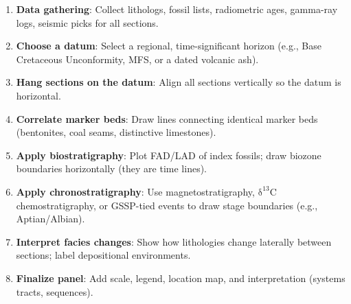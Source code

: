 \documentclass[11pt]{article}
\begin{document}
\begin{methode}
\begin{enumerate}
\item \textbf{Data gathering}: Collect lithologs, fossil lists, radiometric ages, gamma-ray logs, seismic picks for all sections.
\item \textbf{Choose a datum}: Select a regional, time-significant horizon (e.g., Base Cretaceous Unconformity, MFS, or a dated volcanic ash).
\item \textbf{Hang sections on the datum}: Align all sections vertically so the datum is horizontal.
\item \textbf{Correlate marker beds}: Draw lines connecting identical marker beds (bentonites, coal seams, distinctive limestones).
\item \textbf{Apply biostratigraphy}: Plot FAD/LAD of index fossils; draw biozone boundaries horizontally (they are time lines).
\item \textbf{Apply chronostratigraphy}: Use magnetostratigraphy, \ensuremath{\mathrm{\delta^{13}C}} chemostratigraphy, or GSSP-tied events to draw stage boundaries (e.g., Aptian/Albian).
\item \textbf{Interpret facies changes}: Show how lithologies change laterally between sections; label depositional environments.
\item \textbf{Finalize panel}: Add scale, legend, location map, and interpretation (systems tracts, sequences).
\end{enumerate}
\end{methode}
\end{document}
